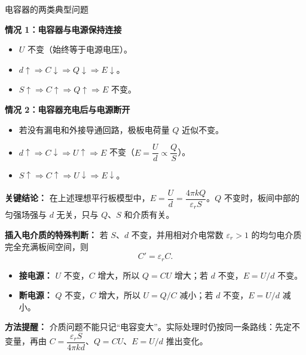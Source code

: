 \begin{conceptbox}{电容器的两类典型问题}

\begin{center}


\label{fig:capacitor-dynamic}
\end{center}

\textbf{情况 1：电容器与电源保持连接}
\begin{itemize}
  \item $U$ 不变（始终等于电源电压）。
  \item $d \uparrow \Rightarrow C \downarrow \Rightarrow Q \downarrow \Rightarrow E \downarrow$。
  \item $S \uparrow \Rightarrow C \uparrow \Rightarrow Q \uparrow \Rightarrow E$ 不变。
\end{itemize}

\textbf{情况 2：电容器充电后与电源断开}
\begin{itemize}
  \item 若没有漏电和外接导通回路，极板电荷量 $Q$ 近似不变。
  \item $d \uparrow \Rightarrow C \downarrow \Rightarrow U \uparrow \Rightarrow E$ 不变（$E = \dfrac{U}{d} \propto \dfrac{Q}{S}$）。
  \item $S \uparrow \Rightarrow C \uparrow \Rightarrow U \downarrow \Rightarrow E \downarrow$。
\end{itemize}

\textbf{关键结论：} 在上述理想平行板模型中，$E = \dfrac{U}{d} = \dfrac{4\pi k Q}{\varepsilon_r S}$。$Q$ 不变时，板间中部的匀强场强与 $d$ 无关，只与 $Q$、$S$ 和介质有关。

\textbf{插入电介质的特殊判断：} 若 $S$、$d$ 不变，并用相对介电常数 $\varepsilon_r>1$ 的均匀电介质完全充满板间空间，则
\[
C'=\varepsilon_r C.
\]
\begin{center}


\label{fig:capacitor-dielectric-insertion}
\end{center}

\begin{itemize}
  \item \textbf{接电源：} $U$ 不变，$C$ 增大，所以 $Q=CU$ 增大；若 $d$ 不变，$E=U/d$ 不变。
  \item \textbf{断电源：} $Q$ 不变，$C$ 增大，所以 $U=Q/C$ 减小；若 $d$ 不变，$E=U/d$ 减小。
\end{itemize}

\textbf{方法提醒：} 介质问题不能只记“电容变大”。实际处理时仍按同一条路线：先定不变量，再由 $C=\dfrac{\varepsilon_r S}{4\pi kd}$、$Q=CU$、$E=U/d$ 推出变化。

\end{conceptbox}

